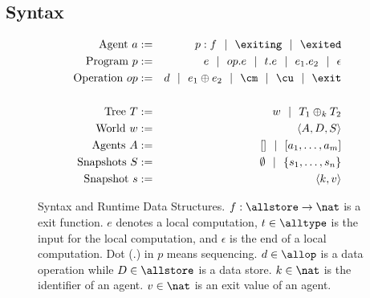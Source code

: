 \subsection{Syntax}\label{sec:syntax}


\begin{figure}
\centering
\begin{eqnarray*}
     \text{Agent } a & := & p:f ~~|~~ \exiting ~~|~~ \exited \\
   \text{Program } p & := & e ~~|~~ op.e ~~|~~ t.e ~~|~~ e_1.e_2 ~~|~~ \epsilon \\
\text{Operation } op & := & d ~~|~~ e_1\oplus e_2 ~~|~~ \cm ~~|~~ \cu ~~|~~ \exit \\
                     &    & \\
      \text{Tree } T & := & w ~~|~~ T_1\oplus_k T_2 \\
     \text{World } w & := & \langle A,D,S\rangle \\
    \text{Agents } A & := & [] ~~|~~ [a_1,\dots,a_m] \\
 \text{Snapshots } S & := & \emptyset ~~|~~ \{s_1,\dots,s_n\} \\
  \text{Snapshot } s & := & \langle k,v\rangle
\end{eqnarray*}
\caption{Syntax and Runtime Data Structures.
$f:\allstore\to\nat$ is a exit function.
$e$ denotes a local computation,
$t\in\alltype$ is the input for the local computation,
and $\epsilon$ is the end of a local computation.
Dot (.) in $p$ means sequencing.
$d\in\allop$ is a data operation while $D\in\allstore$ is a data store.
$k\in\nat$ is the identifier of an agent.
$v\in\nat$ is an exit value of an agent.
}\label{fig:syntax}
\end{figure}

